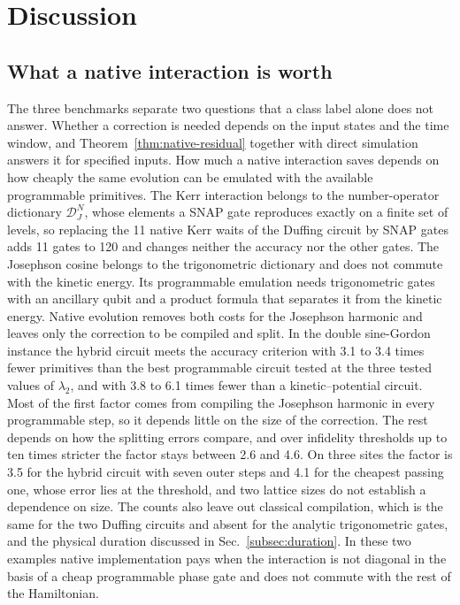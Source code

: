 \documentclass[pra,twocolumn,superscriptaddress,nofootinbib,floatfix]{revtex4-2}
\theoremstyle{remark}
\begin{document}
\section{Discussion}
\label{sec:discussion}

\subsection{What a native interaction is worth}
\label{subsec:worth}

The three benchmarks separate two questions that a class label alone does not answer. Whether a correction is needed depends on the input states and the time window, and Theorem~\ref{thm:native-residual} together with direct simulation answers it for specified inputs. How much a native interaction saves depends on how cheaply the same evolution can be emulated with the available programmable primitives. The Kerr interaction belongs to the number-operator dictionary \(\mathcal D_J^{N}\), whose elements a SNAP gate reproduces exactly on a finite set of levels, so replacing the 11 native Kerr waits of the Duffing circuit by SNAP gates adds 11 gates to 120 and changes neither the accuracy nor the other gates. The Josephson cosine belongs to the trigonometric dictionary and does not commute with the kinetic energy. Its programmable emulation needs trigonometric gates with an ancillary qubit and a product formula that separates it from the kinetic energy. Native evolution removes both costs for the Josephson harmonic and leaves only the correction to be compiled and split. In the double sine-Gordon instance the hybrid circuit meets the accuracy criterion with 3.1 to 3.4 times fewer primitives than the best programmable circuit tested at the three tested values of \(\lambda_2\), and with 3.8 to 6.1 times fewer than a kinetic--potential circuit. Most of the first factor comes from compiling the Josephson harmonic in every programmable step, so it depends little on the size of the correction. The rest depends on how the splitting errors compare, and over infidelity thresholds up to ten times stricter the factor stays between 2.6 and 4.6. On three sites the factor is 3.5 for the hybrid circuit with seven outer steps and 4.1 for the cheapest passing one, whose error lies at the threshold, and two lattice sizes do not establish a dependence on size. The counts also leave out classical compilation, which is the same for the two Duffing circuits and absent for the analytic trigonometric gates, and the physical duration discussed in Sec.~\ref{subsec:duration}. In these two examples native implementation pays when the interaction is not diagonal in the basis of a cheap programmable phase gate and does not commute with the rest of the Hamiltonian.
\end{document}
